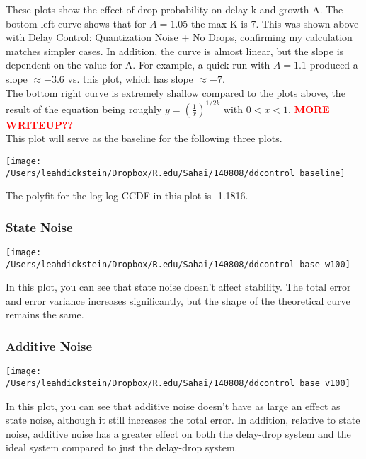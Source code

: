 \documentclass[leqno,twocolumn]{article}
\begin{document}
These plots show the effect of drop probability on delay k and growth A. The bottom left curve shows that for $A = 1.05$ the max K is 7. This was shown above with Delay Control: Quantization Noise + No Drops, confirming my calculation matches simpler cases. In addition, the curve is almost linear, but the slope is dependent on the value for A. For example, a quick run with $A = 1.1$ produced a slope $\approx -3.6$ vs. this plot, which has slope $\approx -7$.\\
The bottom right curve is extremely shallow compared to the plots above, the result of the equation being roughly $y = \left(\frac{1}{x}\right)^{1/2k}$ with $0 < x < 1$. \textcolor{red}{\textbf{MORE WRITEUP??}}\\

This plot will serve as the baseline for the following three plots. 
\begin{center}
\texttt{[image: /Users/leahdickstein/Dropbox/R.edu/Sahai/140808/ddcontrol\_baseline]}\end{center}

The polyfit for the log-log CCDF in this plot is -1.1816.

\subsubsection{State Noise}
\begin{center}
\texttt{[image: /Users/leahdickstein/Dropbox/R.edu/Sahai/140808/ddcontrol\_base\_w100]}\end{center}

In this plot, you can see that state noise doesn't affect stability. The total error and error variance increases significantly, but the shape of the theoretical curve remains the same.

\subsubsection{Additive Noise}
\begin{center}
\texttt{[image: /Users/leahdickstein/Dropbox/R.edu/Sahai/140808/ddcontrol\_base\_v100]}\end{center}

In this plot, you can see that additive noise doesn't have as large an effect as state noise, although it still increases the total error. In addition, relative to state noise, additive noise has a greater effect on both the delay-drop system and the ideal system compared to just the delay-drop system.
\end{document}
